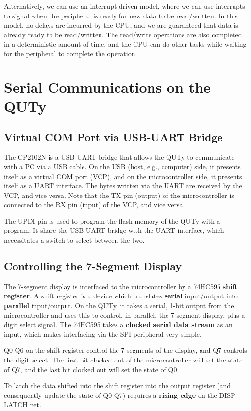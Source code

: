 \documentclass{report}
\begin{document}
Alternatively, we can use an interrupt-driven model, where we can use interrupts to signal when the peripheral is ready for
new data to be read/written. In this model, no delays are incurred by the CPU, and we are guaranteed that data is already ready to be read/written.
The read/write operations are also completed in a deterministic amount of time, and the CPU can do other tasks while waiting for the peripheral to complete the operation.
\section{Serial Communications on the QUTy}
\subsection{Virtual COM Port via USB-UART Bridge}
The CP2102N is a USB-UART bridge that allows the QUTy to communicate with a PC via a USB cable. On the USB (host, e.g., computer) side, it presents itself as a virtual COM port (VCP),
and on the microcontroller side, it presents itself as a UART interface.
The bytes written via the UART are received by the VCP, and vice versa. Note that the TX pin (output) of the microcontroller is connected to the RX pin (input) of the VCP, and vice versa.

The UPDI pin is used to program the flash memory of the QUTy with a program. It share the USB-UART bridge with the UART interface, which necessitates a switch to select between the two.
\subsection{Controlling the 7-Segment Display}
The 7-segment display is interfaced to the microcontroller by a 74HC595 \textbf{shift register}.
A shift register is a device which translates \textbf{serial} input/output into \textbf{parallel} input/output.
On the QUTy, it takes a serial, 1-bit output from the microcontroller and uses this to control, in parallel, the 7-segment display, plus a digit select signal.
The 74HC595 takes a \textbf{clocked serial data stream} as an input, which makes interfacing via the SPI peripheral very simple.

Q0-Q6 on the shift register control the 7 segments of the display, and Q7 controls the digit select.
The first bit clocked out of the microcontroller will set the state of Q7, and the last bit clocked out will set the state of Q0.

To latch the data shifted into the shift register into the output register (and consequently update the state of Q0-Q7) requires a \textbf{rising edge} on the DISP LATCH net.
\end{document}
